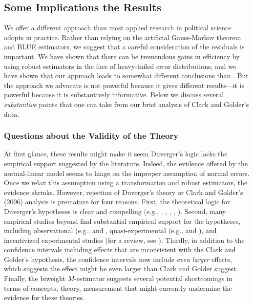 \documentclass[12pt]{article}
\begin{document}
\subsection*{Some Implications the Results}

We offer a different approach than most applied research in political science adopts in practice. 
Rather than relying on the artificial Gauss-Markov theorem and BLUE estimators, we suggest that a careful consideration of the residuals is important. 
We have shown that there can be tremendous gains in efficiency by using robust estimators in the face of heavy-tailed error distributions, and we have shown that our approach leads to somewhat different conclusions than \cite{ClarkGolder2006}. 
But the approach we advocate is not powerful because it gives different results---it is powerful because it is substantively informative. 
Below we discuss several \textit{substantive} points that one can take from our brief analysis of Clark and Golder's data.

\subsubsection*{Questions about the Validity of the Theory}

At first glance, these results might make it seem Duverger's logic lacks the empirical support suggested by the literature. Indeed, the evidence offered by the normal-linear model seems to hinge on the improper assumption of normal errors. 
Once we relax this assumption using a transformation and robust estimators, the evidence shrinks. However, rejection of Duverger's theory or Clark and Golder's (2006) analysis is premature for four reasons. 
First, the theoretical logic for Duverger's hypotheses is clear and compelling (e.g., \citealt{Duverger1963}, \citealt{Riker1982}, \citealt{Cox1997}, \citealt{AmorimNetoCox1997}, \citealt{Cox1999}). 
Second, many empirical studies beyond \cite{ClarkGolder2006} find substantial empirical support for the hypotheses, including observational (e.g., \citealt{ChhibberKollman1998} and \citealt{SingerStephenson2009}, quasi-experimental (e.g., \citealt{Blaisetal2011} and \citealt{Fujiwara2011}), and incentivized experimental studies (for a review, see \citealt{Rietz2008}). 
Thirdly, in addition to the confidence intervals including effects that are inconsistent with the Clark and Golder's hypothesis, the confidence intervals now include \textit{even larger} effects, which suggests the effect might be even larger than Clark and Golder suggest.
Finally, the biweight $M$-estimator suggests several potential shortcomings in terms of concepts, theory, measurement that might currently undermine the evidence for these theories.
\end{document}
